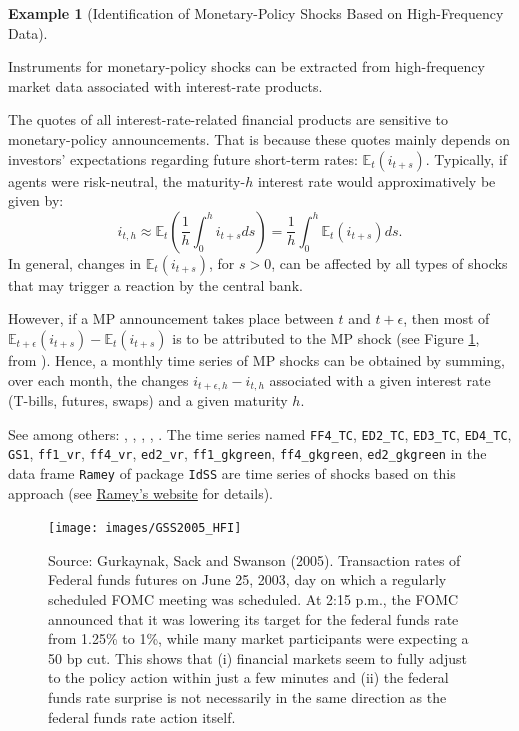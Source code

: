 \documentclass[
  12pt,
]{book}
\theoremstyle{definition}
\theoremstyle{definition}
\newtheorem{example}{Example}[chapter]
\theoremstyle{definition}
\theoremstyle{definition}
\theoremstyle{remark}
\begin{document}
\begin{example}[Identification of Monetary-Policy Shocks Based on High-Frequency Data]
\protect\hypertarget{exm:HighFreq}{}\label{exm:HighFreq}

Instruments for monetary-policy shocks can be extracted from high-frequency market data associated with interest-rate products.

The quotes of all interest-rate-related financial products are sensitive to monetary-policy announcements. That is because these quotes mainly depends on investors' expectations regarding future short-term rates: \(\mathbb{E}_t(i_{t+s})\). Typically, if agents were risk-neutral, the maturity-\(h\) interest rate would approximatively be given by:
\[
i_{t,h} \approx \mathbb{E}_t\left(\frac{1}{h}\int_{0}^{h} i_{t+s} ds\right) = \frac{1}{h}\int_{0}^{h} \mathbb{E}_t\left(i_{t+s}\right) ds.
\]
In general, changes in \(\mathbb{E}_t(i_{t+s})\), for \(s>0\), can be affected by all types of shocks that may trigger a reaction by the central bank.

However, if a MP announcement takes place between \(t\) and \(t+\epsilon\), then most of \(\mathbb{E}_{t+\epsilon}(i_{t+s})-\mathbb{E}_t(i_{t+s})\) is to be attributed to the MP shock (see Figure \ref{fig:HighFreq}, from \citet{Gurkaynak_et_al_2005}). Hence, a monthly time series of MP shocks can be obtained by summing, over each month, the changes \(i_{t+ \epsilon,h} - i_{t,h}\) associated with a given interest rate (T-bills, futures, swaps) and a given maturity \(h\).

See among others: \citet{KUTTNER2001523}, \citet{Cochrane_Piazzesi_2002}, \citet{Gurkaynak_et_al_2005}, \citet{Piazzesi_Swanson_2008}, \citet{Gertler_Karadi_2015}. The time series named
\texttt{FF4\_TC}, \texttt{ED2\_TC}, \texttt{ED3\_TC}, \texttt{ED4\_TC}, \texttt{GS1}, \texttt{ff1\_vr}, \texttt{ff4\_vr}, \texttt{ed2\_vr}, \texttt{ff1\_gkgreen}, \texttt{ff4\_gkgreen}, \texttt{ed2\_gkgreen} in the data frame \texttt{Ramey} of package \texttt{IdSS} are time series of shocks based on this approach (see \href{https://econweb.ucsd.edu/~vramey/research/Ramey_HOM_monetary.zip}{Ramey's website} for details).

\begin{figure}
\texttt{[image: images/GSS2005\_HFI]} \caption{Source: Gurkaynak, Sack and Swanson (2005). Transaction rates of Federal funds futures on June 25, 2003, day on which a regularly scheduled FOMC meeting was scheduled. At 2:15 p.m., the FOMC announced that it was lowering its target for the federal funds rate from 1.25\% to 1\%, while many market participants were expecting a 50 bp cut. This shows that (i) financial markets seem to fully adjust to the policy action within just a few minutes and (ii) the federal funds rate surprise is not necessarily in the same direction as the federal funds rate action itself.}\label{fig:HighFreq}
\end{figure}

\end{example}
\end{document}
